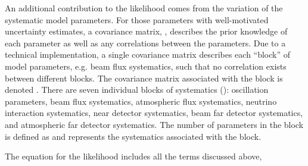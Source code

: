 An additional contribution to the likelihood comes from the variation of the systematic model parameters. For those parameters with well-motivated uncertainty estimates, a covariance matrix, , describes the prior knowledge of each parameter as well as any correlations between the parameters. Due to a technical implementation, a single covariance matrix describes each ``block'' of model parameters, e.g. beam flux systematics, such that no correlation exists between different blocks. The covariance matrix associated with the  block is denoted . 
There are seven individual blocks of systematics (): oscillation parameters, beam flux systematics, atmospheric flux systematics, neutrino interaction systematics, near detector systematics, beam far detector systematics, and atmospheric far detector systematics. The number of parameters in the  block is defined as  and  represents the systematics associated with the  block.

The equation for the likelihood  includes all the terms discussed above,

